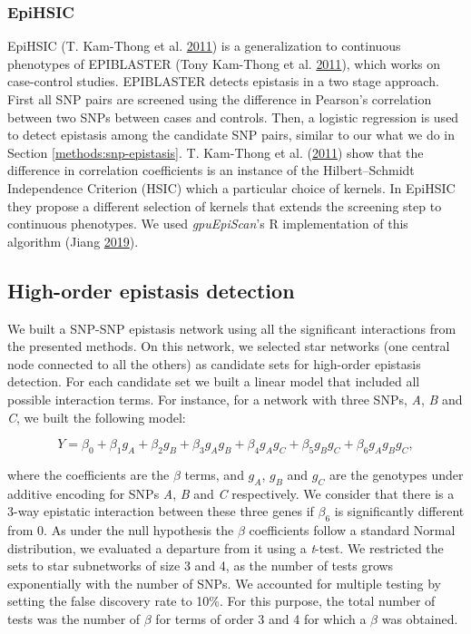 \documentclass[
  11pt,
]{env/yjiao}
\begin{document}
\hypertarget{epihsic}{%
\subsubsection{EpiHSIC}\label{epihsic}}

EpiHSIC (T. Kam-Thong et al. \protect\hyperlink{ref-kam-thong_epistasis_2011}{2011}) is a generalization to continuous phenotypes of EPIBLASTER (Tony Kam-Thong et al. \protect\hyperlink{ref-kam-thong_epiblaster-fast_2011}{2011}), which works on case-control studies. EPIBLASTER detects epistasis in a two stage approach. First all SNP pairs are screened using the difference in Pearson's correlation between two SNPs between cases and controls. Then, a logistic regression is used to detect epistasis among the candidate SNP pairs, similar to our what we do in Section \ref{methods:snp-epistasis}. T. Kam-Thong et al. (\protect\hyperlink{ref-kam-thong_epistasis_2011}{2011}) show that the difference in correlation coefficients is an instance of the Hilbert--Schmidt Independence Criterion (HSIC) which a particular choice of kernels. In EpiHSIC they propose a different selection of kernels that extends the screening step to continuous phenotypes. We used \emph{gpuEpiScan}'s R implementation of this algorithm (Jiang \protect\hyperlink{ref-gpuEpiScan}{2019}).

\hypertarget{methods-high-order}{%
\subsection{High-order epistasis detection}\label{methods-high-order}}

We built a SNP-SNP epistasis network using all the significant interactions from the presented methods. On this network, we selected star networks (one central node connected to all the others) as candidate sets for high-order epistasis detection. For each candidate set we built a linear model that included all possible interaction terms. For instance, for a network with three SNPs, \emph{A}, \emph{B} and \emph{C}, we built the following model:

\[Y = \beta_0 + \beta_1 g_A + \beta_2 g_B + \beta_3 g_A g_B + \beta_4 g_A g_C + \beta_5 g_B g_C + \beta_6 g_A g_B g_C,\]

where the coefficients are the \(\beta\) terms, and \(g_A\), \(g_B\) and \(g_C\) are the genotypes under additive encoding for SNPs \emph{A}, \emph{B} and \emph{C} respectively. We consider that there is a 3-way epistatic interaction between these three genes if \(\beta_6\) is significantly different from 0. As under the null hypothesis the \(\beta\) coefficients follow a standard Normal distribution, we evaluated a departure from it using a \emph{t}-test. We restricted the sets to star subnetworks of size 3 and 4, as the number of tests grows exponentially with the number of SNPs. We accounted for multiple testing by setting the false discovery rate to 10\%. For this purpose, the total number of tests was the number of \(\beta\) for terms of order 3 and 4 for which a \(\beta\) was obtained.
\end{document}

